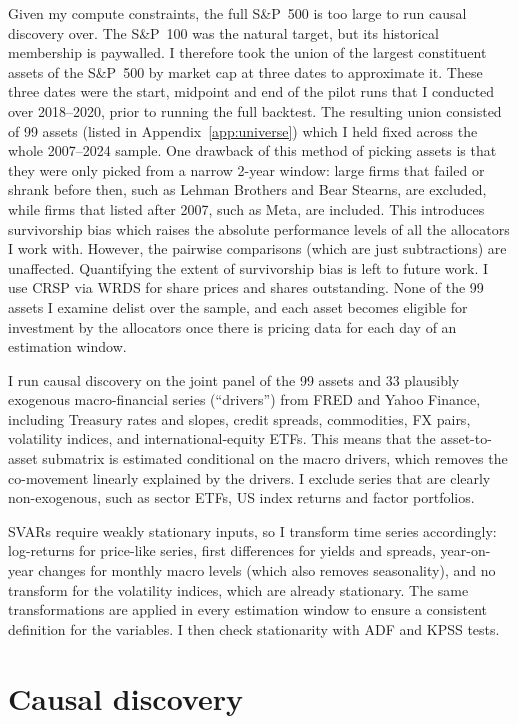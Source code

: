 \documentclass[11pt, a4paper]{report}
\begin{document}
Given my compute constraints, the full S\&P~500 is too large to run causal discovery over.
The S\&P~100 was the natural target, but its historical membership is paywalled. I therefore took the union of the largest constituent assets of the S\&P~500 by market cap at three dates to approximate it. These three dates were the start, midpoint and end of the pilot runs that I conducted over 2018--2020, prior to running the full backtest. The resulting union consisted of 99 assets (listed in Appendix~\ref{app:universe}) which I held fixed across the whole 2007--2024 sample.
One drawback of this method of picking assets is that they were only picked from a narrow 2-year window: large firms that failed or shrank before then, such as Lehman Brothers and Bear Stearns, are excluded, while firms that listed after 2007, such as Meta, are included.
This introduces survivorship bias which raises the absolute performance levels of all the allocators I work with. However, the pairwise comparisons (which are just subtractions) are unaffected.
Quantifying the extent of survivorship bias is left to future work.
I use CRSP via WRDS for share prices and shares outstanding. None of the 99 assets I examine delist over the sample, and each asset becomes eligible for investment by the allocators once there is pricing data for each day of an estimation window.

I run causal discovery on the joint panel of the 99
assets and 33 plausibly exogenous macro-financial series (``drivers'') from FRED and
Yahoo Finance, including Treasury rates and slopes, credit spreads, commodities, FX
pairs, volatility indices, and international-equity ETFs. 
This means that the asset-to-asset submatrix is estimated conditional on the macro drivers, which removes the co-movement linearly explained by the drivers. I exclude series that are clearly non-exogenous, such as sector ETFs, US index returns and factor portfolios.

SVARs require weakly stationary inputs, so I transform time series accordingly: log-returns for price-like series, first differences for yields and spreads, year-on-year changes for monthly macro levels (which also removes seasonality), and no transform for the volatility indices, which are already stationary. 
The same transformations are applied in every estimation window to ensure a consistent definition for the variables.
I then check stationarity with ADF and KPSS tests. 

\section{Causal discovery}
\label{sec:discovery-run}
\end{document}

